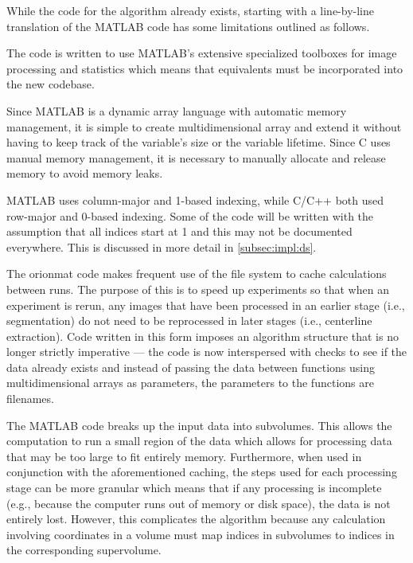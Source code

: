 While the code for the algorithm already exists, starting with a line-by-line
translation of the MATLAB code has some limitations outlined as follows.
\begin{description}[font=\textpluscolon]
\item[Toolbox\label{desc:matlab:toolbox}] The code is written to use MATLAB's extensive 
	specialized toolboxes for image processing and
	statistics which means that equivalents must be
	incorporated into the new codebase.
\item[Memory management\label{desc:matlab:mem}] Since MATLAB is a dynamic array language with
	automatic memory management, it is simple to create
	multidimensional array and extend it without having to
	keep track of the variable's size or the variable
	lifetime. Since C uses manual memory management, it is
	necessary to manually allocate and release memory to avoid
	memory leaks.
\item[Data layout differences]
	MATLAB uses column-major and 1-based indexing, while C/C++
	both used row-major and 0-based indexing. Some of the code
	will be written with the assumption that all indices start
	at 1 and this may not be documented everywhere. This is
	discussed in more detail in \cref{subsec:impl:ds}.
\item[Caching\label{desc:matlab:cache}] The \gls{orionmat} code makes frequent use of the file system
	to cache calculations between runs. The purpose of this is
	to speed up experiments so that when an experiment is
	rerun, any images that have been processed in an earlier
	stage (i.e., segmentation) do not need to be reprocessed
	in later stages (i.e., centerline extraction). Code
	written in this form imposes an algorithm structure
	that is no longer strictly imperative --- the code is now
	interspersed with checks to see if the data already exists
	and instead of passing the data between functions using
	multidimensional arrays as parameters, the parameters to
	the functions are filenames.
\item[Subvolume\label{desc:matlab:subvol}] The MATLAB code breaks up the input data into
	subvolumes. This allows the computation to run a small
	region of the data which allows for processing data that
	may be too large to fit entirely memory. Furthermore, when
	used in conjunction with the aforementioned caching, the
	steps used for each processing stage can be more granular
	which means that if any processing is incomplete (e.g.,
	because the computer runs out of memory or disk space),
	the data is not entirely lost. However, this complicates
	the algorithm because any calculation involving
	coordinates in a volume must map indices in subvolumes to
	indices in the corresponding supervolume.
\end{description}


